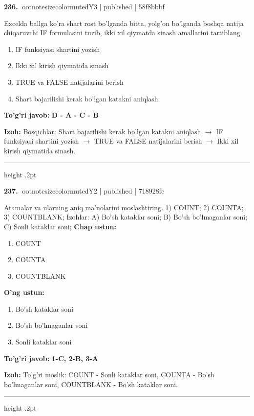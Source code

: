 \documentclass[10pt,a4paper]{article}
\begin{document}
\textbf{\color{ink}236.} {ootnotesizecolor{muted}Y3 | published | 58f8bbbf}
\par
Excelda ballga ko'ra shart rost bo'lganda bitta, yolg'on bo'lganda boshqa natija chiqaruvchi IF formulasini tuzib, ikki xil qiymatda sinash amallarini tartiblang.
\begin{enumerate}[label=\Alph*),leftmargin=9mm]
\item IF funksiyasi shartini yozish
\item Ikki xil kirish qiymatida sinash
\item TRUE va FALSE natijalarini berish
\item Shart bajarilishi kerak bo'lgan katakni aniqlash
\end{enumerate}
\begin{tcolorbox}[enhanced,breakable,colback=teal!4,colframe=teal!55!black,boxrule=0.45pt,arc=1.2mm,left=2.8mm,right=2.8mm,top=2mm,bottom=2mm]
\textbf{\color{teal}To'g'ri javob:} \textbf{D - A - C - B}
\par\smallskip
\textbf{Izoh:} Bosqichlar: Shart bajarilishi kerak bo'lgan katakni aniqlash \ensuremath{\rightarrow} IF funksiyasi shartini yozish \ensuremath{\rightarrow} TRUE va FALSE natijalarini berish \ensuremath{\rightarrow} Ikki xil kirish qiymatida sinash.
\end{tcolorbox}
\vspace{2mm}\hrule height .2pt\vspace{2mm}

\textbf{\color{ink}237.} {ootnotesizecolor{muted}Y2 | published | 718928fc}
\par
Atamalar va ularning aniq ma'nolarini moslashtiring.  1) COUNT;  2) COUNTA;  3) COUNTBLANK;  Izohlar: A) Bo'sh kataklar soni;  B) Bo'sh bo'lmaganlar soni;  C) Sonli kataklar soni;
\textbf{Chap ustun:}\begin{enumerate}[label=\arabic*),leftmargin=9mm]
\item COUNT
\item COUNTA
\item COUNTBLANK
\end{enumerate}
\textbf{O'ng ustun:}\begin{enumerate}[label=\Alph*),leftmargin=9mm]
\item Bo'sh kataklar soni
\item Bo'sh bo'lmaganlar soni
\item Sonli kataklar soni
\end{enumerate}
\begin{tcolorbox}[enhanced,breakable,colback=teal!4,colframe=teal!55!black,boxrule=0.45pt,arc=1.2mm,left=2.8mm,right=2.8mm,top=2mm,bottom=2mm]
\textbf{\color{teal}To'g'ri javob:} \textbf{1-C, 2-B, 3-A}
\par\smallskip
\textbf{Izoh:} To'g'ri moslik: COUNT - Sonli kataklar soni, COUNTA - Bo'sh bo'lmaganlar soni, COUNTBLANK - Bo'sh kataklar soni.
\end{tcolorbox}
\vspace{2mm}\hrule height .2pt\vspace{2mm}
\end{document}
